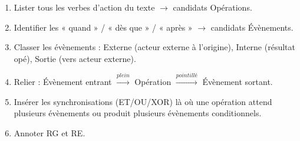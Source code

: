 \documentclass[11pt]{article}
\begin{document}
\begin{methode}
\begin{enumerate}
    \item Lister tous les verbes d'action du texte $\to$ candidats Opérations.
    \item Identifier les « quand » / « dès que » / « après » $\to$ candidats Évènements.
    \item Classer les évènements : Externe (acteur externe à l'origine), Interne (résultat opé), Sortie (vers acteur externe).
    \item Relier : Évènement entrant $\xrightarrow{plein}$ Opération $\xrightarrow{pointillé}$ Évènement sortant.
    \item Insérer les synchronisations (ET/OU/XOR) là où une opération attend plusieurs évènements ou produit plusieurs évènements conditionnels.
    \item Annoter RG et RE.
\end{enumerate}
\end{methode}
\end{document}
